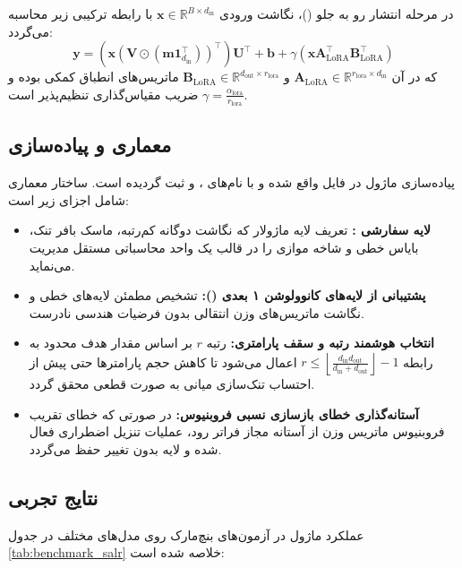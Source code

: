 در مرحله انتشار رو به جلو ()، نگاشت ورودی $\mathbf{x} \in \mathbb{R}^{B \times d_{\text{in}}}$ با رابطه ترکیبی زیر محاسبه می‌گردد:
\begin{equation}
\mathbf{y} = \left(\mathbf{x} (\mathbf{V} \odot (\mathbf{m} \mathbf{1}_{d_{\text{in}}}^\top))^\top \right) \mathbf{U}^\top + \mathbf{b} + \gamma \left( \mathbf{x} \mathbf{A}_{\text{LoRA}}^\top \mathbf{B}_{\text{LoRA}}^\top \right)
\end{equation}
که در آن $\mathbf{A}_{\text{LoRA}} \in \mathbb{R}^{r_{\text{lora}} \times d_{\text{in}}}$ و $\mathbf{B}_{\text{LoRA}} \in \mathbb{R}^{d_{\text{out}} \times r_{\text{lora}}}$ ماتریس‌های انطباق کمکی بوده و $\gamma = \frac{\alpha_{\text{lora}}}{r_{\text{lora}}}$ ضریب مقیاس‌گذاری تنظیم‌پذیر است.

\subsection{معماری و پیاده‌سازی}
پیاده‌سازی ماژول  در فایل  واقع شده و با نام‌های ،  و  ثبت گردیده است. ساختار معماری شامل اجزای زیر است:
\begin{itemize}
    \item \textbf{لایه سفارشی :} تعریف لایه ماژولار که نگاشت دوگانه کم‌رتبه، ماسک بافر تنک، بایاس خطی و شاخه موازی  را در قالب یک واحد محاسباتی مستقل مدیریت می‌نماید.
    \item \textbf{پشتیبانی از لایه‌های کانوولوشن ۱ بعدی ():} تشخیص مطمئن لایه‌های خطی و نگاشت ماتریس‌های وزن انتقالی بدون فرضیات هندسی نادرست.
    \item \textbf{انتخاب هوشمند رتبه و سقف پارامتری:} رتبه $r$ بر اساس مقدار هدف محدود به رابطه $r \le \left\lfloor \frac{d_{\text{in}} d_{\text{out}}}{d_{\text{in}} + d_{\text{out}}} \right\rfloor - 1$ اعمال می‌شود تا کاهش حجم پارامترها حتی پیش از احتساب تنک‌سازی میانی به صورت قطعی محقق گردد.
    \item \textbf{آستانه‌گذاری خطای بازسازی نسبی فروبنیوس:} در صورتی که خطای تقریب فروبنیوس ماتریس وزن از آستانه مجاز فراتر رود، عملیات تنزیل اضطراری فعال شده و لایه بدون تغییر حفظ می‌گردد.
\end{itemize}

\subsection{نتایج تجربی}
عملکرد ماژول  در آزمون‌های بنچ‌مارک روی مدل‌های مختلف در جدول \ref{tab:benchmark_salr} خلاصه شده است:

